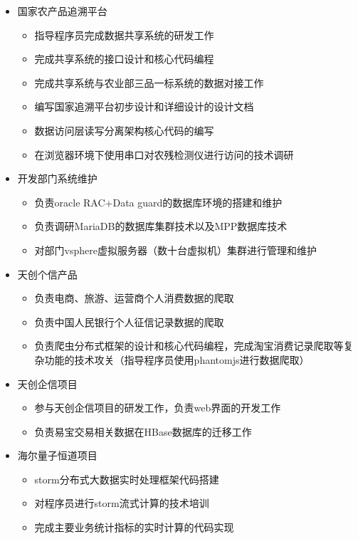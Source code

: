 \documentclass{resume}
\begin{document}
\begin{itemize}
  \item 国家农产品追溯平台
  \begin{itemize}
    \item 指导程序员完成数据共享系统的研发工作
    \item 完成共享系统的接口设计和核心代码编程
    \item 完成共享系统与农业部三品一标系统的数据对接工作
    \item 编写国家追溯平台初步设计和详细设计的设计文档
    \item 数据访问层读写分离架构核心代码的编写
    \item 在浏览器环境下使用串口对农残检测仪进行访问的技术调研
  \end{itemize}
  \item 开发部门系统维护
  \begin{itemize}
    \item 负责oracle RAC+Data guard的数据库环境的搭建和维护
    \item 负责调研MariaDB的数据库集群技术以及MPP数据库技术
    \item 对部门vsphere虚拟服务器（数十台虚拟机）集群进行管理和维护
  \end{itemize}
\end{itemize}

\begin{itemize}
  \item 天创个信产品
  \begin{itemize}
    \item 负责电商、旅游、运营商个人消费数据的爬取
    \item 负责中国人民银行个人征信记录数据的爬取
    \item 负责爬虫分布式框架的设计和核心代码编程，完成淘宝消费记录爬取等复杂功能的技术攻关（指导程序员使用phantomjs进行数据爬取）
  \end{itemize}
  \item 天创企信项目
  \begin{itemize}
    \item 参与天创企信项目的研发工作，负责web界面的开发工作
    \item 负责易宝交易相关数据在HBase数据库的迁移工作
  \end{itemize}
\end{itemize}

\begin{itemize}
  \item 海尔量子恒道项目
  \begin{itemize}
    \item storm分布式大数据实时处理框架代码搭建
    \item 对程序员进行storm流式计算的技术培训
    \item 完成主要业务统计指标的实时计算的代码实现
  \end{itemize}
\end{itemize}
\end{document}
